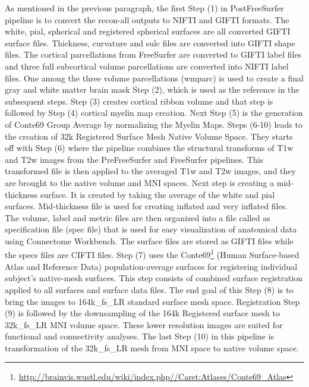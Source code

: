 As mentioned in the previous paragraph, the first Step (1) in PostFreeSurfer pipeline is to convert the recon-all outputs to NIFTI and GIFTI formats. The white, pial, spherical and registered spherical surfaces are all converted GIFTI surface files. Thickness, curvature and sulc files are converted into GIFTI shape files. The cortical parcellations from FreeSurfer are converted to GIFTI label files and three full subcortical volume parcellations are converted into NIFTI label files. One among the three volume parcellations (wmparc) is used to create a final gray and white matter brain mask Step (2), which is used as the reference in the subsequent steps. Step (3) creates cortical ribbon volume and that step is followed by Step (4) cortical myelin map creation. Next Step (5) is the generation of Conte69 Group Average by normalizing the Myelin Maps. 
Steps (6-10) leads to the creation of 32k Registered Surface Mesh Native Volume Space. They starts off with Step (6) where the pipeline combines the structural transforms of T1w and T2w images from the PreFreeSurfer and FreeSurfer pipelines. This transformed file is then applied to the averaged T1w and T2w images, and they are brought to the native volume and MNI spaces. Next step is creating a mid-thickness surface. It is created by taking the average of the white and pial surfaces. Mid-thickness file is used for creating inflated and very inflated files. The volume, label and metric files are then organized into a file called as specification file (spec file) that is used for easy visualization of anatomical data using Connectome Workbench. The surface files are stored as GIFTI files while the specs files are CIFTI files. Step (7) uses the Conte69\footnote{\url{http://brainvis.wustl.edu/wiki/index.php//Caret:Atlases/Conte69\_Atlas}} (Human Surface-based Atlas and Reference Data) population-average surfaces for registering individual subject's native-mesh surfaces. This step consists of combined surface registration applied to all surfaces and surface data files. The end goal of this Step (8) is to bring the images to 164k\_fs\_LR standard surface mesh space. Registration Step (9) is followed by the downsampling of the 164k Registered surface mesh to 32k\_fs\_LR MNI volume space. These lower resolution images are suited for functional and connectivity analyses. The last Step (10) in this pipeline is transformation of the 32k\_fs\_LR mesh from MNI space to native volume space.~\cite{Gla13}

